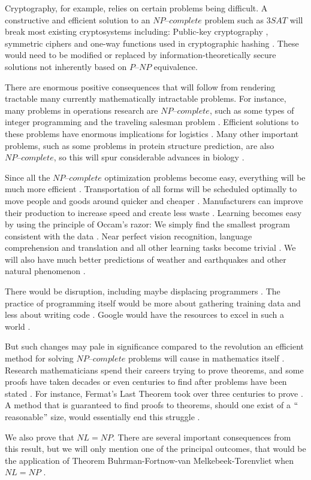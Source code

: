 \documentclass[a4paper,UKenglish,cleveref, autoref]{lipics-v2019}
\begin{document}
Cryptography, for example, relies on certain problems being difficult. A constructive and efficient solution to an $\textit{NP--complete}$ problem such as $3SAT$ will break most existing cryptosystems including: Public-key cryptography \cite{HW97}, symmetric ciphers \cite{MM00} and one-way functions used in cryptographic hashing \cite{DKV07}. These would need to be modified or replaced by information-theoretically secure solutions not inherently based on $\textit{P--NP}$ equivalence.

There are enormous positive consequences that will follow from rendering tractable many currently mathematically intractable problems. For instance, many problems in operations research are $\textit{NP--complete}$, such as some types of integer programming and the traveling salesman problem \cite{GJ79}. Efficient solutions to these problems have enormous implications for logistics \cite{CS00}. Many other important problems, such as some problems in protein structure prediction, are also $\textit{NP--complete}$, so this will spur considerable advances in biology \cite{BL98}.

Since all the $\textit{NP--complete}$ optimization problems become easy, everything will be much more efficient \cite{LF09}. Transportation of all forms will be scheduled optimally to move people and goods around quicker and cheaper \cite{LF09}. Manufacturers can improve their production to increase speed and create less waste \cite{LF09}. Learning becomes easy by using the principle of Occam's razor: We simply find the smallest program consistent with the data \cite{LF09}. Near perfect vision recognition, language comprehension and translation and all other learning tasks become trivial \cite{LF09}. We will also have much better predictions of weather and earthquakes and other natural phenomenon \cite{LF09}.

There would be disruption, including maybe displacing programmers \cite{IMP95}. The practice of programming itself would be more about gathering training data and less about writing code \cite{IMP95}. Google would have the resources to excel in such a world \cite{IMP95}.

But such changes may pale in significance compared to the revolution an efficient method for solving $\textit{NP--complete}$ problems will cause in mathematics itself \cite{CS00}. Research mathematicians spend their careers trying to prove theorems, and some proofs have taken decades or even centuries to find after problems have been stated \cite{AS17}. For instance, Fermat's Last Theorem took over three centuries to prove \cite{AS17}. A method that is guaranteed to find proofs to theorems, should one exist of a $``$reasonable$"$ size, would essentially end this struggle \cite{CS00}.

We also prove that $NL = NP$. There are several important consequences from this result, but we will only mention one of the principal outcomes, that would be the application of Theorem Buhrman-Fortnow-van Melkebeek-Torenvliet when $NL = NP$ \cite{BU00}.


\end{document}
